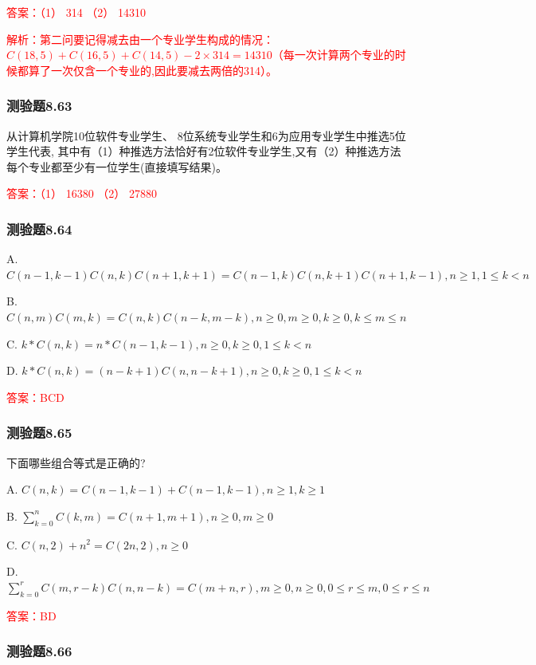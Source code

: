 \documentclass[UTF8, heading=true]{ctexart}
\begin{document}
\textcolor{red}{答案：（1） 314 （2） 14310}

\textcolor{red}{解析：第二问要记得减去由一个专业学生构成的情况：$C(18,5)+C(16,5)+C(14,5)-2\times 314 = 14310$（每一次计算两个专业的时候都算了一次仅含一个专业的,因此要减去两倍的314）。}

\subsubsection{测验题8.63}
从计算机学院10位软件专业学生、
8位系统专业学生和6为应用专业学生中推选5位学生代表,
其中有（1）种推选方法恰好有2位软件专业学生,又有（2）种推选方法每个专业都至少有一位学生(直接填写结果)。

\textcolor{red}{答案：（1） 16380 （2） 27880}


\subsubsection{测验题8.64}

A. $C(n-1, k-1) C(n, k) C(n+1, k+1)=C(n-1, k) C(n, k+1) C(n+1, k-1), n \geq 1,1 \leq k<n$

B. $ C(n, m) C(m, k)=C(n, k) C(n-k, m-k), n \geq 0, m \geq 0, k \geq 0, k \leq m \leq n$

C. $ k * C(n, k)=n * C(n-1, k-1),  n \geq 0, k \geq 0,1 \leq k<n$

D. $ k * C(n, k)=(n-k+1) C(n, n-k+1), n \geq 0, k \geq 0,1 \leq k<n$

\textcolor{red}{答案：BCD}

\subsubsection{测验题8.65}

下面哪些组合等式是正确的?

A. $C(n, k)=C(n-1, k-1)+C(n-1, k-1),  n \geq 1, k \geq 1$

B. $ \sum_{k=0}^n C(k, m)=C(n+1, m+1),  n \geq 0, m \geq 0$

C. $C(n, 2)+n^2=C(2 n, 2),  n \geq 0$

D. $ \sum_{k=0}^r C(m, r-k) C(n, n-k)=C(m+n, r), m \geq 0, n \geq 0,0 \leq r \leq m, 0 \leq r \leq n$

\textcolor{red}{答案：BD}

\subsubsection{测验题8.66}
\end{document}
